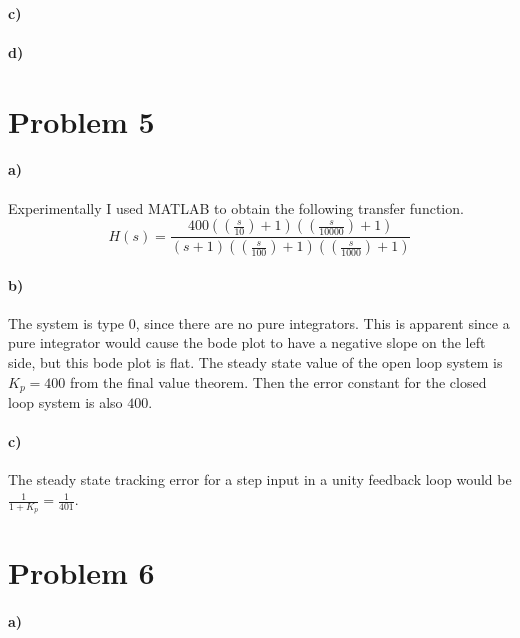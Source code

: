 \documentclass[12pt]{article}
\begin{document}
\paragraph{c)}

\paragraph{d)}

\section*{Problem 5}

\paragraph{a)}

Experimentally I used MATLAB to obtain the following transfer function.
\[H(s)=\frac{400\left(\left(\frac{s}{10}\right)+1\right)\left(\left(\frac{s}{10000}\right)+1\right)}{(s+1)\left(\left(\frac{s}{100}\right)+1\right)\left(\left(\frac{s}{1000}\right)+1\right)}\]

\paragraph{b)}

The system is type 0, since there are no pure integrators. This is apparent since a pure integrator would cause the bode plot to have a negative slope on the left side, but this
bode plot is flat. The steady state value of the open loop system is \(K_p=400\) from the final value theorem. Then the error constant for the closed loop
system is also \(400\).

\paragraph{c)}

The steady state tracking error for a step input in a unity feedback loop would be \(\frac{1}{1+K_p}=\frac{1}{401}\).

\section*{Problem 6}

\paragraph{a)}
\end{document}
